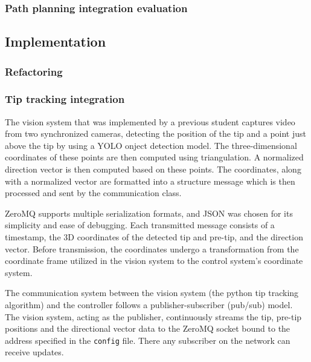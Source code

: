 \subsubsection{Path planning integration evaluation}


\subsection{Implementation}

\subsubsection{Refactoring}

\subsubsection{Tip tracking integration}

The vision system that was implemented by a previous student  captures video from two synchronized cameras, detecting the position of the tip and a point just above   the tip by using a YOLO onject detection model. The three-dimensional coordinates of these points are then computed using triangulation. A normalized direction vector is then computed based on these points. The coordinates, along with a normalized vector are formatted into a structure message which is then processed and sent by the communication class. 


ZeroMQ supports multiple serialization formats, and JSON was chosen for its simplicity and ease of debugging. Each transmitted message consists of a timestamp, the 3D coordinates of the detected tip and pre-tip, and the direction vector. Before transmission, the coordinates undergo a transformation from the coordinate frame utilized in the vision system to the control system's coordinate system. 

The communication system between the vision system (the python tip tracking algorithm) and the controller follows a publisher-subscriber (pub/sub) model. The vision system, acting as the publisher, continuously streams the tip, pre-tip positions and the directional vector data to the ZeroMQ socket bound to the address specified in the \texttt{config} file. There any subscriber on the network can receive updates. 

